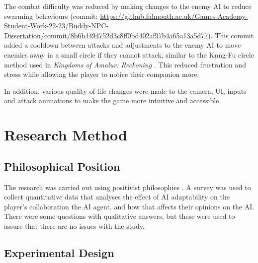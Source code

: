 \documentclass{IEEEtran}
\begin{document}
The combat difficulty was reduced by making changes to the enemy AI to reduce swarming behaviours (commit: \url{https://github.falmouth.ac.uk/Games-Academy-Student-Work-22-23/Buddy-NPC-Dissertation/commit/8b6b4494752d3c8ff0bd402af97b4a65a13a5d77}). This commit added a cooldown between attacks and adjustments to the enemy AI to move enemies away in a small circle if they cannot attack, similar to the Kung-Fu circle method used in \textit{Kingdoms of Amalur: Reckoning} \cite{GAIPKungFuCircle}. This reduced frustration and stress while allowing the player to notice their companion more.

In addition, various quality of life changes were made to the camera, UI, inputs and attack animations to make the game more intuitive and accessible.

\section{Research Method}
\label{ResearchMethod}

\subsection{Philosophical Position}
\label{PhilosophicalPosition}



The research was carried out using positivist philosophies \cite{Zukauskas18}. A survey was used to collect quantitative data that analyses the effect of AI adaptability on the player's collaboration the AI agent, and how that affects their opinions on the AI. There were some questions with qualitative answers, but these were used to assure that there are no issues with the study.

\subsection{Experimental Design}
\label{ExperimentalDesign}
\end{document}
